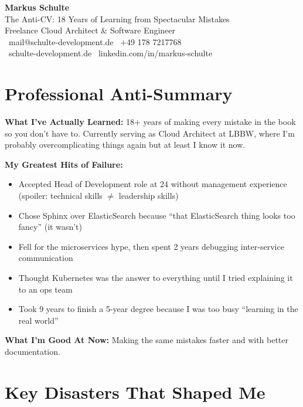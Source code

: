 \documentclass[11pt,a4paper]{article}
\begin{document}
\begin{center}
{\Huge\bfseries\color{darkblue} Markus Schulte}\\[0.5em]
{\large\color{gray} The Anti-CV: 18 Years of Learning from Spectacular Mistakes}\\[0.5em]
{\normalsize Freelance Cloud Architect \& Software Engineer}\\[0.3em]
{\small \faEnvelope\ mail@schulte-development.de \quad \faPhone\ +49 178 7217768}\\
{\small \faGlobe\ schulte-development.de \quad \faLinkedin\ linkedin.com/in/markus-schulte}
\end{center}

\vspace{0.5em}

\section{Professional Anti-Summary}

\textbf{What I've Actually Learned:} 18+ years of making every mistake in the book so you don't have to. Currently serving as Cloud Architect at LBBW, where I'm probably overcomplicating things again but at least I know it now.

\textbf{My Greatest Hits of Failure:}
\begin{itemize}[leftmargin=1.5em, itemsep=0.1em]
\item Accepted Head of Development role at 24 without management experience (spoiler: technical skills $\neq$ leadership skills)
\item Chose Sphinx over ElasticSearch because ``that ElasticSearch thing looks too fancy'' (it wasn't)
\item Fell for the microservices hype, then spent 2 years debugging inter-service communication
\item Thought Kubernetes was the answer to everything until I tried explaining it to an ops team
\item Took 9 years to finish a 5-year degree because I was too busy ``learning in the real world''
\end{itemize}

\textbf{What I'm Good At Now:} Making the same mistakes faster and with better documentation.

\section{Key Disasters That Shaped Me}
\end{document}
